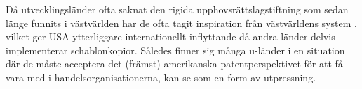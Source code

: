 Då utvecklingsländer ofta saknat den rigida upphovsrättslagstiftning som sedan länge funnits i västvärlden har de ofta tagit inspiration från västvärldens system \cite{finger}, vilket ger USA ytterliggare internationellt inflyttande då andra länder delvis implementerar schablonkopior. Således finner sig många u-länder i en situation där de måste acceptera det (främst) amerikanska patentperspektivet för att få vara med i handelsorganisationerna, kan se som en form av utpressning.

